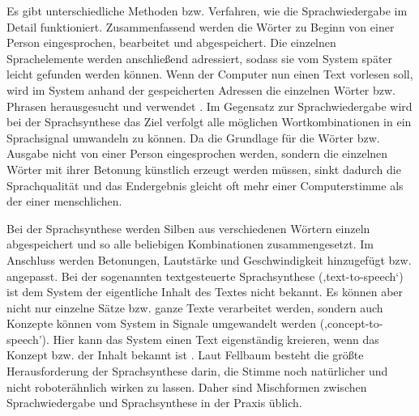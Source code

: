Es gibt unterschiedliche Methoden bzw. Verfahren, wie die Sprachwiedergabe im Detail funktioniert. Zusammenfassend werden die Wörter zu Beginn von einer Person eingesprochen, bearbeitet und abgespeichert. Die einzelnen Sprachelemente werden anschließend adressiert, sodass sie vom System später leicht gefunden werden können. Wenn der Computer nun einen Text vorlesen soll, wird im System anhand der gespeicherten Adressen die einzelnen Wörter bzw. Phrasen herausgesucht und verwendet \cite{FellbaumSprache}.
\newline \newline
Im Gegensatz zur Sprachwiedergabe wird bei der Sprachsynthese das Ziel verfolgt alle möglichen Wortkombinationen in ein Sprachsignal umwandeln zu können. Da die Grundlage für die Wörter bzw. Ausgabe nicht von einer Person eingesprochen werden, sondern die einzelnen Wörter mit ihrer Betonung künstlich erzeugt werden müssen, sinkt dadurch die Sprachqualität und das Endergebnis gleicht oft mehr einer Computerstimme als der einer menschlichen. 

Bei der Sprachsynthese werden Silben aus verschiedenen Wörtern einzeln abgespeichert und so alle beliebigen Kombinationen zusammengesetzt. Im Anschluss werden Betonungen, Lautstärke und Geschwindigkeit hinzugefügt bzw. angepasst. Bei der sogenannten textgesteuerte Sprachsynthese (‚text-to-speech‘) ist dem System der eigentliche Inhalt des Textes nicht bekannt. Es können aber nicht nur einzelne Sätze bzw. ganze Texte verarbeitet werden, sondern auch Konzepte können vom System in Signale umgewandelt werden (,concept-to-speech'). Hier kann das System einen Text eigenständig kreieren, wenn das Konzept bzw. der Inhalt bekannt ist \cite{FellbaumSprache}.
\newline \newline
Laut Fellbaum \cite{FellbaumSprache} besteht die größte Herausforderung der Sprachsynthese darin, die Stimme noch natürlicher und nicht roboterähnlich wirken zu lassen. Daher sind Mischformen zwischen Sprachwiedergabe und Sprachsynthese in der Praxis üblich. 


